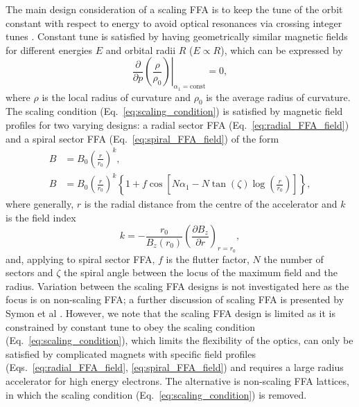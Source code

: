\documentclass[../main.tex]{subfiles}
\begin{document}
The main design consideration of a scaling FFA is to keep the tune of the orbit constant with respect to energy to avoid optical resonances via crossing integer tunes \cite{symon1956fixed}. Constant tune is satisfied by having geometrically similar magnetic fields for different energies $E$ and orbital radii $R$ ($E\propto R$), which can be expressed by
\begin{equation}
\left.\frac{\partial}{\partial p} \left(\frac{\rho}{\rho_{0}}\right)\right|_{\alpha_{1}=\mathrm{const}}=0,
\label{eq:scaling_condition}    
\end{equation}
where $\rho$ is the local radius of curvature and $\rho_{0}$ is the average radius of curvature. The scaling condition (Eq.~\ref{eq:scaling_condition}) is satisfied by magnetic field profiles for two varying designs: a radial sector FFA (Eq.~\ref{eq:radial_FFA_field}) and a spiral sector FFA (Eq.~\ref{eq:spiral_FFA_field}) of the form \cite{symon1956fixed}
\begin{align}
B &= B_{0}\left(\frac{r}{r_{0}}\right)^{k}, 
\label{eq:radial_FFA_field} \\
B &= B_{0}\left(\frac{r}{r_{0}}\right)^{k}\left\{1+f\cos\left[N\alpha_{1}-N\tan\left(\zeta\right)\log\left(\frac{r}{r_{0}}\right)\right]\right\},
\label{eq:spiral_FFA_field}
\end{align}
where generally, $r$ is the radial distance from the centre of the accelerator and $k$ is the field index
\begin{equation}
k=-\frac{r_{0}}{B_{z}\left(r_{0}\right)}\left(\frac{\partial B_{z}}{\partial r}\right)_{r=r_{0}},
\label{eq:FFAG_field_index}
\end{equation}
and, applying to spiral sector FFA, $f$ is the flutter factor, $N$ the number of sectors and $\zeta$ the spiral angle between the locus of the maximum field and the radius. Variation between the scaling FFA designs is not investigated here as the focus is on non-scaling FFA; a further discussion of scaling FFA is presented by Symon et al \cite{symon1956fixed}. However, we note that the scaling FFA design is limited as it is constrained by constant tune to obey the scaling condition (Eq.~\ref{eq:scaling_condition}), which limits the flexibility of the optics, can only be satisfied by complicated magnets with specific field profiles (Eqs.~\ref{eq:radial_FFA_field}, \ref{eq:spiral_FFA_field}) and requires a large radius accelerator for high energy electrons. The alternative is non-scaling FFA lattices, in which the scaling condition (Eq.~\ref{eq:scaling_condition}) is removed.
\end{document}
